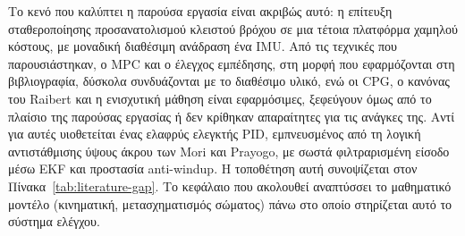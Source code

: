 \documentclass[11pt]{report}
\begin{document}
Το κενό που καλύπτει η παρούσα εργασία είναι ακριβώς αυτό: η επίτευξη
σταθεροποίησης προσανατολισμού κλειστού βρόχου σε μια τέτοια πλατφόρμα
χαμηλού κόστους, με μοναδική διαθέσιμη ανάδραση ένα IMU. Από τις τεχνικές που
παρουσιάστηκαν, ο MPC και ο έλεγχος εμπέδησης, στη μορφή που εφαρμόζονται στη
βιβλιογραφία, δύσκολα συνδυάζονται με το διαθέσιμο υλικό, ενώ οι CPG, ο
κανόνας του Raibert και η ενισχυτική μάθηση είναι εφαρμόσιμες, ξεφεύγουν όμως
από το πλαίσιο της παρούσας εργασίας ή δεν κρίθηκαν απαραίτητες για τις
ανάγκες της. Αντί για αυτές υιοθετείται ένας ελαφρύς ελεγκτής PID, εμπνευσμένος
από τη λογική αντιστάθμισης ύψους άκρου των Mori και Prayogo, με σωστά
φιλτραρισμένη είσοδο μέσω EKF και προστασία anti-windup. Η τοποθέτηση αυτή
συνοψίζεται στον Πίνακα~\ref{tab:literature-gap}. Το κεφάλαιο που
ακολουθεί αναπτύσσει το μαθηματικό μοντέλο (κινηματική, μετασχηματισμός
σώματος) πάνω στο οποίο στηρίζεται αυτό το σύστημα ελέγχου.
\end{document}
